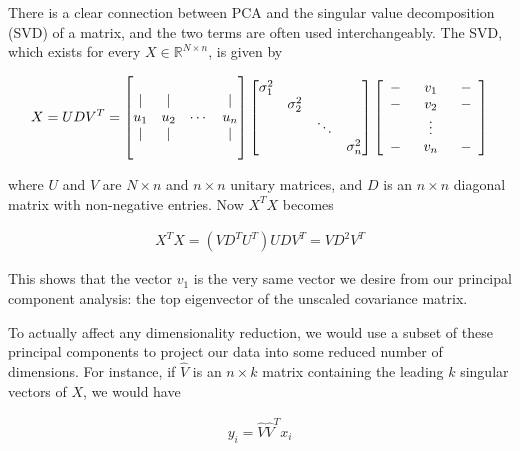 There is a clear connection between PCA and the singular value
decomposition (SVD) of a matrix, and the two terms are often used
interchangeably. The SVD, which exists for every
$X \in \mathbb{R}^{N \times n}$, is given by

\begin{align}
  X = U D V^T =   
  \begin{bmatrix}
    & & & \\ 
    | & | &  & |  \\
    u_1 & u_2 & \cdots & u_n \\
    | & | &  & |  \\
    & & &  \\
  \end{bmatrix}
  \begin{bmatrix} 
    \sigma_1^2 & & & \\
    & \sigma_2^2 & & \\
    & & \ddots & \\
    & &  & \sigma_n^2 \\
  \end{bmatrix}
  \left[ \begin{array}{ccccc}
           - & \multicolumn{3}{c}{v_1} & - \\
           - & \multicolumn{3}{c}{v_2} & - \\
             & & \vdots & & \\
           - & \multicolumn{3}{c}{v_n} & - \\
         \end{array} \right]
\end{align}

where $U$ and $V$ are $N \times n$ and $n \times n$ unitary matrices,
and $D$ is an $n \times n$ diagonal matrix with non-negative
entries. Now $X^TX$ becomes

\begin{align}
  X^T X = (V D^T U^T) U D V^T = V D^2 V^T
\end{align}

This shows that the vector $v_1$ is the very same vector we desire
from our principal component analysis: the top eigenvector of the
unscaled covariance matrix.

To actually affect any dimensionality reduction, we would use a subset
of these principal components to project our data into some reduced
number of dimensions. For instance, if $\hat{V}$ is an $n \times k$
matrix containing the leading $k$ singular vectors of $X$, we would
have

\begin{align}
  y_i = \hat{V}\hat{V}^T x_i
\end{align}

